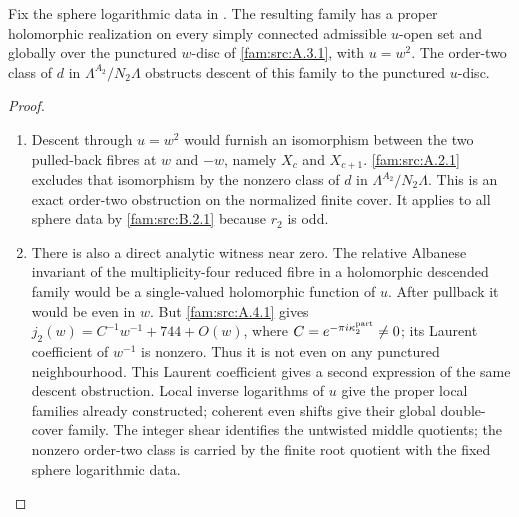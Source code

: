 \begin{proposition}\hypertarget{tag-01QD}{}\label{fam:src:B.2.3}\label{fam:st:B.2.3}

Fix the sphere logarithmic data in \cite[Remark~8.1, p.~22]{Engel2026}.
The resulting family has a proper holomorphic realization on every
simply connected admissible $u$-open set and globally over the punctured
$w$-disc of \cref{fam:src:A.3.1}, with $u=w^2$.
The order-two class of $d$ in $\Lambda^{A_2}/N_2\Lambda$ obstructs
descent of this family to the punctured $u$-disc.
\end{proposition}


\begin{proof}
\begin{enumerate}[label=\arabic*.,leftmargin=*]
\item Descent through $u=w^2$ would furnish an isomorphism between the two pulled-back fibres at $w$ and $-w$, namely $X_c$ and $X_{c+1}$. \ref{fam:src:A.2.1} excludes that isomorphism by the nonzero class of $d$ in $\Lambda^{A_2}/N_2\Lambda$. This is an exact order-two obstruction on the normalized finite cover. It applies to all sphere data by \ref{fam:src:B.2.1} because $r_2$ is odd.

\item There is also a direct analytic witness near zero. The relative Albanese invariant of the multiplicity-four reduced fibre in a holomorphic descended family would be a single-valued holomorphic function of $u$. After pullback it would be even in $w$. But \ref{fam:src:A.4.1} gives $j_2(w)=C^{-1}w^{-1}+744+O(w)$, where $C=e^{-\pi i\kappa_2^{\rm part}}\ne0$; its Laurent coefficient of $w^{-1}$ is nonzero. Thus it is not even on any punctured neighbourhood. This Laurent coefficient gives a second expression of the same descent obstruction. Local inverse logarithms of $u$ give the proper local families already constructed; coherent even shifts give their global double-cover family. The integer shear identifies the untwisted middle quotients; the nonzero order-two class is carried by the finite root quotient with the fixed sphere logarithmic data.
\end{enumerate}
\end{proof}
